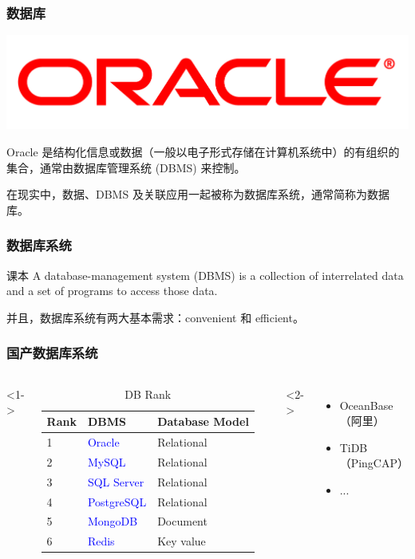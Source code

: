 \documentclass[aspectratio=169, 14pt]{beamer}
\begin{document}
\begin{frame}
    \frametitle{数据库}
    \includegraphics[width=0.5\paperwidth]{image/oracle}
    \begin{exampleblock}{Oracle}
        是结构化信息或数据（一般以电子形式存储在计算机系统中）的有组织的集合，通常由数据库管理系统 (DBMS) 来控制。

        在现实中，数据、DBMS 及关联应用一起被称为\alert{数据库系统}，通常简称为数据库。 
    \end{exampleblock}
\end{frame}

\begin{frame}
    \frametitle{数据库系统}
    \begin{block}{课本}
        A database-management system (DBMS) is a collection of interrelated data and a set of programs to access those data.
    \end{block}
    并且，数据库系统有两大基本需求：\alert{convenient} 和 \alert{efficient}。
\end{frame}

\begin{frame}
    \frametitle{国产数据库系统}
    \begin{columns}
        <1->
        \begin{table}
            \caption{DB Rank}
            \begin{tabular}{lll}
              \toprule
              Rank & DBMS & Database Model \\
              \midrule
              1 & \textcolor{blue}{Oracle} & Relational \\
              2 & \textcolor{blue}{MySQL} & Relational \\
              3 & \textcolor{blue}{SQL Server} & Relational \\
              4 & \textcolor{blue}{PostgreSQL} & Relational \\
              5 & \textcolor{blue}{MongoDB} & Document \\
              6 & \textcolor{blue}{Redis} & Key value \\
              \bottomrule
            \end{tabular}
        \end{table}
        <2->
        \begin{itemize}
            \item OceanBase （阿里）
            \item TiDB （PingCAP）
            \item ...
        \end{itemize}
    \end{columns}

\end{frame}
\end{document}

